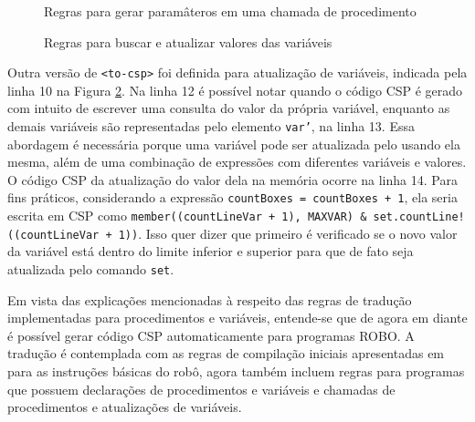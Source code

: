 \begin{figure}[h]
\centering
\caption{Regras para gerar paramâteros em uma chamada de procedimento}

\label{fig:rules_param}
\end{figure}

\begin{figure}[h]
\centering
\caption{Regras para buscar e atualizar valores das variáveis}

\label{fig:rules_var}
\end{figure}

Outra versão de \texttt{<to-csp>} foi definida para atualização de variáveis, indicada pela linha 10 na Figura \ref{fig:rules_var}. Na linha 12 é possível notar quando o código CSP é gerado com intuito de escrever uma consulta do valor da própria variável, enquanto as demais variáveis são representadas pelo elemento \texttt{var'}, na linha 13. Essa abordagem é necessária porque uma variável pode ser atualizada pelo usando ela mesma, além de uma combinação de expressões com diferentes variáveis e valores. O código CSP da atualização do valor dela na memória ocorre na linha 14. Para fins práticos, considerando a expressão \texttt{countBoxes = countBoxes + 1}, ela seria escrita em CSP como \texttt{member((countLineVar + 1), MAXVAR) \& set.countLine!((countLineVar + 1))}. Isso quer dizer que primeiro é verificado se o novo valor da variável está dentro do limite inferior e superior para que de fato seja atualizada pelo comando \texttt{set}.

Em vista das explicações mencionadas à respeito das regras de tradução implementadas para procedimentos e variáveis, entende-se que de agora em diante é possível gerar código CSP automaticamente para programas ROBO. A tradução é contemplada com as regras de compilação iniciais apresentadas em \cite{nogueira} para as instruções básicas do robô, agora também incluem regras para programas que possuem declarações de procedimentos e variáveis e chamadas de procedimentos e atualizações de variáveis.

